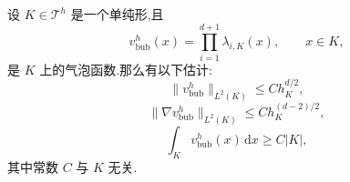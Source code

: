 \begin{lemma}[气泡函数的性质]\label{lem:bubble-function-properties}
设 $K\in\mathcal{T}^h$ 是一个单纯形,且
\[
  v_{\mathrm{bub}}^h(x)=\prod_{i=1}^{d+1}\lambda_{i,K}(x),
  \qquad x\in K,
\]
是 $K$ 上的气泡函数.那么有以下估计:
\begin{equation}\label{eq:bubble-function-l2}
  \|v_{\mathrm{bub}}^h\|_{L^2(K)}\le C h_K^{d/2},
\end{equation}
\begin{equation}\label{eq:bubble-function-gradient}
  \|\nabla v_{\mathrm{bub}}^h\|_{L^2(K)}
  \le C h_K^{(d-2)/2},
\end{equation}
\begin{equation}\label{eq:bubble-function-integral}
  \int_K v_{\mathrm{bub}}^h(x)\,\mathrm{d}x\ge C|K|,
\end{equation}
其中常数 $C$ 与 $K$ 无关.
\end{lemma}

